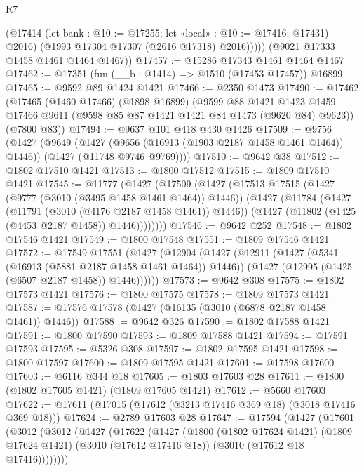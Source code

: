 \begin{lexlean}{R7}
\begin{coremodule}
              (@17414 (let bank : @10 := @17255; let «local» : @10 := @17416; @17431) @2016)
              (@1993 @17304 @17307 (@2616 @17318) @2016)))))
      (@9021 @17333 @1458 @1461 @1464 @1467))
@17457 := @15286 @17343 @1461 @1464 @1467
@17462 := @17351 (fun (__b : @1414) => @1510 (@17453 @17457)) @16899
@17465 := @9592 @89 @1424 @1421
@17466 := @2350 @1473
@17490 := @17462
    (@17465
      (@1460 @17466)
      (@1898 @16899)
      (@9599
        @88
        @1421
        @1423
        @1459
        @17466
        @9611
        (@9598 @85 @87 @1421 @1421 @84 @1473 (@9620 @84) @9623))
      (@7800 @83))
@17494 := @9637 @101 @418 @430 @1426
@17509 := @9756
    (@1427
      (@9649
        (@1427 (@9656 (@16913 (@1903 @2187 @1458 @1461 @1464)) @1446))
        (@1427 (@11748 @9746 @9769))))
@17510 := @9642 @38
@17512 := @1802 @17510 @1421
@17513 := @1800 @17512
@17515 := @1809 @17510 @1421
@17545 := @11777
    (@1427
      (@17509
        (@1427
          (@17513
            @17515
            (@1427 (@9777 (@3010 (@3495 @1458 @1461 @1464)) @1446))
            (@1427
              (@11784
                (@1427 (@11791 (@3010 (@4176 @2187 @1458 @1461)) @1446))
                (@1427 (@11802 (@1425 (@4453 @2187 @1458)) @1446))))))))
@17546 := @9642 @252
@17548 := @1802 @17546 @1421
@17549 := @1800 @17548
@17551 := @1809 @17546 @1421
@17572 := @17549
    @17551
    (@1427
      (@12904
        (@1427
          (@12911
            (@1427 (@5341 (@16913 (@5881 @2187 @1458 @1461 @1464)) @1446))
            (@1427 (@12995 (@1425 (@6507 @2187 @1458)) @1446))))))
@17573 := @9642 @308
@17575 := @1802 @17573 @1421
@17576 := @1800 @17575
@17578 := @1809 @17573 @1421
@17587 := @17576 @17578 (@1427 (@16135 (@3010 (@6878 @2187 @1458 @1461)) @1446))
@17588 := @9642 @326
@17590 := @1802 @17588 @1421
@17591 := @1800 @17590
@17593 := @1809 @17588 @1421
@17594 := @17591 @17593
@17595 := @5326 @308
@17597 := @1802 @17595 @1421
@17598 := @1800 @17597
@17600 := @1809 @17595 @1421
@17601 := @17598 @17600
@17603 := @6116 @344 @18
@17605 := @1803 @17603 @28
@17611 := @1800 (@1802 @17605 @1421) (@1809 @17605 @1421)
@17612 := @5660 @17603
@17622 := @17611 (@17015 (@17612 (@3213 @17416 @369 @18) (@3018 @17416 @369 @18)))
@17624 := @2789 @17603 @28
@17647 := @17594
    (@1427
      (@17601
        (@3012
          (@3012
            (@1427
              (@17622
                (@1427
                  (@1800
                    (@1802 @17624 @1421)
                    (@1809 @17624 @1421)
                    (@3010 (@17612 @17416 @18))
                    (@3010 (@17612 @18 @17416))))))))

\end{coremodule}
\end{lexlean}
